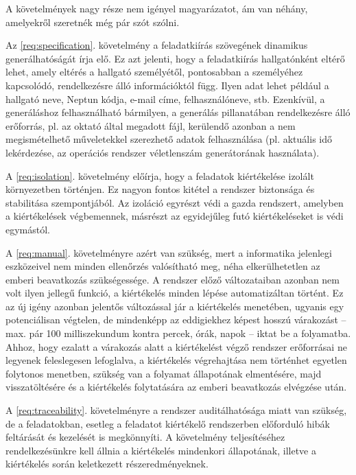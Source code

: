 A követelmények nagy része nem igényel magyarázatot, ám van néhány, amelyekről szeretnék még pár szót szólni.

Az \ref{req:specification}. követelmény a feladatkiírás szövegének dinamikus generálhatóságát írja elő.
Ez azt jelenti, hogy a feladatkiírás hallgatónként eltérő lehet, amely eltérés a hallgató személyétől, pontosabban a személyéhez kapcsolódó, rendelkezésre álló információktól függ.
Ilyen adat lehet például a hallgató neve, Neptun kódja, e-mail címe, felhasználóneve, stb.
Ezenkívül, a generáláshoz felhasználható bármilyen, a generálás pillanatában rendelkezésre álló erőforrás, pl. az oktató által megadott fájl, kerülendő azonban a nem megismételhető műveletekkel szerezhető adatok felhasználása (pl. aktuális idő lekérdezése, az operációs rendszer véletlenszám generátorának használata).

A \ref{req:isolation}. követelmény előírja, hogy a feladatok kiértékelése izolált környezetben történjen.
Ez nagyon fontos kitétel a rendszer biztonsága és stabilitása szempontjából.
Az izoláció egyrészt védi a gazda rendszert, amelyben a kiértékelések végbemennek, másrészt az egyidejűleg futó kiértékeléseket is védi egymástól.

A \ref{req:manual}. követelményre azért van szükség, mert a informatika jelenlegi eszközeivel nem minden ellenőrzés valósítható meg, néha elkerülhetetlen az emberi beavatkozás szükségessége.
A rendszer előző változataiban azonban nem volt ilyen jellegű funkció, a kiértékelés minden lépése automatizáltan történt.
Ez az új igény azonban jelentős változással jár a kiértékelés menetében, ugyanis egy potenciálisan végtelen, de mindenképp az eddigiekhez képest hosszú várakozást -- max. pár 100 milliszekundum kontra percek, órák, napok -- iktat be a folyamatba.
Ahhoz, hogy ezalatt a várakozás alatt a kiértékelést végző rendszer erőforrásai ne legyenek feleslegesen lefoglalva, a kiértékelés végrehajtása nem történhet egyetlen folytonos menetben, szükség van a folyamat állapotának elmentésére, majd visszatöltésére és a kiértékelés folytatására az emberi beavatkozás elvégzése után.

A \ref{req:traceability}. követelményre a rendszer auditálhatósága miatt van szükség, de a feladatokban, esetleg a feladatot kiértékelő rendszerben előforduló hibák feltárását és kezelését is megkönnyíti.
A követelmény teljesítéséhez rendelkezésünkre kell állnia a kiértékelés mindenkori állapotának, illetve a kiértékelés során keletkezett részeredményeknek.

